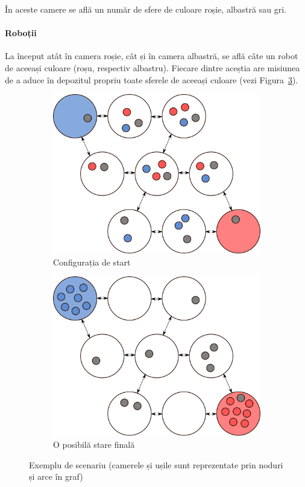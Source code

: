 \documentclass[12pt]{article}
\begin{document}
În aceste camere se află un număr de sfere de culoare roșie, albastră sau
gri.

\paragraph{Roboții}

La început atât în camera roșie, cât și în camera albastră, se află
câte un robot de aceeași culoare (roșu, respectiv albastru). Fiecare
dintre aceștia are misiunea de a aduce în depozitul propriu toate
sferele de aceeași culoare (vezi Figura~\ref{fig:exemplu}).

\begin{figure}[h!]
  \centering
  \begin{subfigure}[b]{0.48\textwidth}
    \includegraphics[width=\textwidth]{graphics/start.pdf}
    \caption{Configurația de start}
    \label{fig:start}
  \end{subfigure}
  \begin{subfigure}[b]{0.48\textwidth}
    \includegraphics[width=\textwidth]{graphics/final.pdf}
    \caption{O posibilă stare finală}
    \label{fig:final}
  \end{subfigure}
  \caption{Exemplu de scenariu (camerele și ușile sunt reprezentate
    prin noduri și arce în graf)}
  \label{fig:exemplu}
\end{figure}
\end{document}
